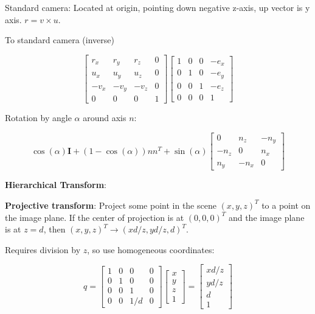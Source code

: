 \documentclass[9pt,landscape]{extarticle}
\newcommand{\identity}{\mathbf{I}}
\begin{document}
\begin{multicols}{3}
\begin{multicols}{2}
\end{multicols}

Standard camera: Located at origin, pointing down negative z-axis, up vector is y axis. $r = v \times u$.

To standard camera (inverse)

$$
\begin{bmatrix}
r_x & r_y & r_z & 0 \\
u_x & u_y & u_z & 0 \\
-v_x & -v_y & -v_z & 0 \\
0 & 0 & 0 & 1
\end{bmatrix}
\begin{bmatrix}
1 & 0 & 0 & -e_x \\
0 & 1 & 0 & -e_y \\
0 & 0 & 1 & -e_z \\
0 & 0 & 0 & 1
\end{bmatrix}
$$

Rotation by angle $\alpha$ around axis $n$:

$$\cos(\alpha)\identity + (1 - \cos(\alpha))nn^T + \sin(\alpha)\begin{bmatrix}
    0 & n_z & -n_y \\
    -n_z & 0 & n_x \\
    n_y & -n_x & 0
\end{bmatrix}$$

\textbf{Hierarchical Transform}:

\textbf{Projective transform}: Project some point in the scene $(x, y, z)^T$ to a point on the image plane. If the center of projection is at $(0, 0, 0)^T$ and the image plane is at $z = d$, then $(x, y, z)^T \rightarrow (xd/z, yd/z, d)^T$.

Requires division by $z$, so use homogeneous coordinates:

$$
q = \begin{bmatrix}
        1 & 0 & 0 & 0 \\
        0 & 1 & 0 & 0 \\
        0 & 0 & 1 & 0 \\
        0 & 0 & 1/d & 0
    \end{bmatrix}
    \begin{bmatrix}
        x \\
        y \\
        z \\
        1
    \end{bmatrix} =
    \begin{bmatrix}
        xd/z \\
        yd/z \\
        d \\
        1
    \end{bmatrix}
$$



\end{multicols}
\end{document}
